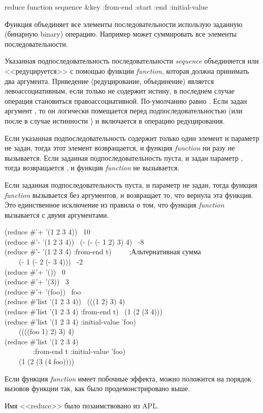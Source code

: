 \begin{defun}[Функция]
reduce function sequence &key :from-end :start :end :initial-value

Функция  объединяет все элементы последовательности использую
заданную (бинарную binary) операцию. Например \cdf{+} может суммировать все
элементы последовательности.

Указанная подпоследовательность последовательности \emph{sequence} объединяется
или <<редуцируется>> с помощью функции \emph{function}, которая должна принимать
два аргумента. Приведение (редуцирование, объединение) является
левоассоциативным, если только  не содержит истину, в последнем
случае операция становиться правоассоциативной. По-умолчанию
 равно {\nil}.
Если задан аргумент , то он логически помещается перед
подпоследовательностью (или после в случае истинности ) и
включается в операцию редуцирования.

Если указанная подпоследовательность содержит только один элемент и параметр
 не задан, тогда этот элемент возвращается, и функция
\emph{function} ни разу не вызывается.
Если заданная подпоследовательность пуста, и задан параметр ,
тогда возвращается , и функция \emph{function} не вызывается.

Если заданная подпоследовательность пуста, и параметр  не задан,
тогда функция \emph{function} вызывается без аргументов, и 
возвращает то, что вернула эта функция. Это единственное исключение из правила о
том, что функция \emph{function} вызывается с двумя аргументами.

\begin{lisp}
(reduce \#'+ '(1 2 3 4)) \EV\ 10 \\
(reduce \#'- '(1 2 3 4)) \EQ\ (- (- (- 1 2) 3) 4) \EV\ -8 \\
(reduce \#'- '(1 2 3 4) :from-end t)~~~~~;\textrm{Альтернативная сумма} \\
~~~\EQ\ (- 1 (- 2 (- 3 4))) \EV\ -2 \\
(reduce \#'+ '()) \EV\ 0 \\
(reduce \#'+ '(3)) \EV\ 3 \\
(reduce \#'+ '(foo)) \EV\ foo \\
(reduce \#'list '(1 2 3 4)) \EV\ (((1 2) 3) 4) \\
(reduce \#'list '(1 2 3 4) :from-end t) \EV\ (1 (2 (3 4))) \\
(reduce \#'list '(1 2 3 4) :initial-value 'foo) \\
~~~\EV\ ((((foo 1) 2) 3) 4) \\
(reduce \#'list '(1 2 3 4) \\
~~~~~~~~:from-end t :initial-value 'foo) \\
~~~\EV\ (1 (2 (3 (4 foo))))
\end{lisp}
Если функция \emph{function} имеет побочные эффекта, можно положится на порядок
вызовов функции так, как было продемонстрировано выше.

Имя <<reduce>> было позаимствовано из {APL}.
\end{defun}

